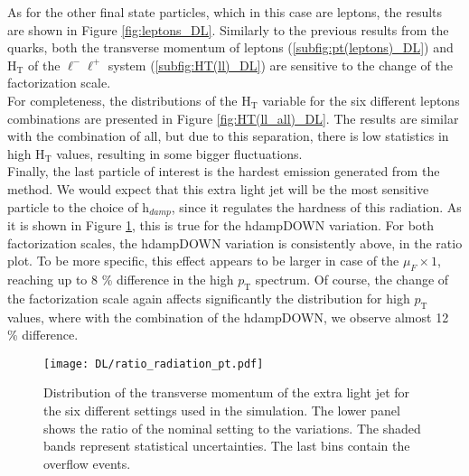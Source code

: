 \indent As for the other final state particles, which in this case are leptons, the results are shown in Figure \ref{fig:leptons_DL}. Similarly to the previous results from the quarks, both the transverse momentum of leptons (\ref{subfig:pt(leptons)_DL}) and H$_{\text{T}}$ of the $\ell^-\ell^+$ system (\ref{subfig:HT(ll)_DL}) are sensitive to the change of the factorization scale.\\
For completeness, the distributions of the H$_{\text{T}}$ variable for the six different leptons combinations are presented in Figure \ref{fig:HT(ll_all)_DL}. The results are similar with the combination of all, but due to this separation, there is low statistics in high H$_{\text{T}}$ values, resulting in some bigger fluctuations.\\
\indent Finally, the last particle of interest is the hardest emission generated from the {\selectfont{Powheg}} method. We would expect that this extra light jet will be the most sensitive particle to the choice of  h$_{damp}$, since it regulates the hardness of this radiation. As it is shown in Figure \ref{fig:radiation_DL}, this is true for the hdampDOWN variation. For both factorization scales, the hdampDOWN variation is consistently above, in the ratio plot. To be more specific, this effect appears to be larger in case of the $\mu_F \times 1$, reaching up to 8 \% difference in the high $p_{\text{T}}$ spectrum. Of course, the change of the factorization scale again affects significantly the distribution for high $p_{\text{T}}$ values, where with the combination of the hdampDOWN, we observe almost 12 \% difference.
\begin{figure}[htb!]
    \centering
    \texttt{[image: DL/ratio\_radiation\_pt.pdf]}
    \caption{Distribution of the transverse momentum of the extra light jet for the six different settings used in the simulation. The lower panel shows the ratio of the nominal setting to the variations. The shaded bands represent statistical uncertainties. The last bins contain the overflow events.}
    \label{fig:radiation_DL}
\end{figure}
\newpage
